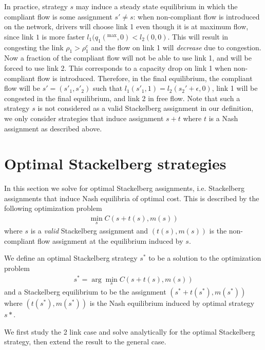 In practice, strategy $s$ may induce a steady state equilibrium in which the compliant flow is some assignment $s' \neq s$: when non-compliant flow is introduced on the network, drivers will choose link 1 even though it is at maximum flow, since link $1$ is more faster $l_1(q_1(^{\max}, 0) < l_2(0, 0)$. This will result in congesting the link $\rho_1 > \rho_1^c$ and the flow on link 1 will \emph{decrease} due to congestion. Now a fraction of the compliant flow will not be able to use link 1, and will be forced to use link 2. This corresponds to a capacity drop on link 1 when non-compliant flow is introduced. Therefore, in the final equilibrium, the compliant flow will be $s' = (s'_1, s'_2)$ such that $l_1(s'_1, 1) = l_2(s_2' + \epsilon, 0)$, link 1 will be congested in the final equilibrium, and link 2 in free flow. Note that such a strategy $s$ is not considered as a valid Stackelberg assignment in our definition, we only consider strategies that induce assignment $s + t$ where $t$ is a Nash assignment as described above.









\section{Optimal Stackelberg strategies}

In this section we solve for optimal Stackelberg assignments, i.e. Stackelberg assignments that induce Nash equilibria of optimal cost. This is described by the following optimization problem
\begin{align*}
\min_s C\left( s + t(s), m(s) \right)
\end{align*}
where $s$ is a \emph{valid} Stackelberg assignment and $(t(s), m(s))$ is the non-compliant flow assignment at the equilibrium induced by $s$.

We define an optimal Stackelberg strategy $s^*$ to be a solution to the optimization problem
\begin{align*}
s^* = \arg \min_s C\left( s + t(s), m(s) \right)
\end{align*}
and a Stackelberg equilibrium to be the assignment $(s^* + t(s^*), m(s^*))$ where $(t(s^*), m(s^*))$ is the Nash equilibrium induced by optimal strategy $s*$.


\bigskip
We first study the 2 link case and solve analytically for the optimal Stackelberg strategy, then extend the result to the general case.

